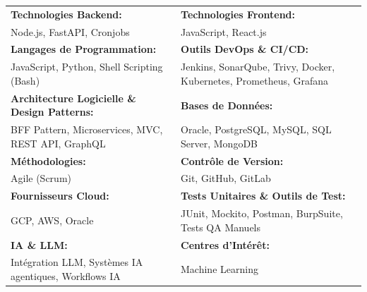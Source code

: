 \renewcommand{\arraystretch}{1.2}

\begin{tabular}{p{} p{}}
    \textbf{Technologies Backend:} & \textbf{Technologies Frontend:} \\
    Node.js, FastAPI, Cronjobs & JavaScript, React.js \\

    \textbf{Langages de Programmation:} & \textbf{Outils DevOps \& CI/CD:} \\
    JavaScript, Python, Shell Scripting (Bash) & Jenkins, SonarQube, Trivy, Docker, Kubernetes, Prometheus, Grafana \\

    \textbf{Architecture Logicielle \& Design Patterns:} & \textbf{Bases de Données:} \\
    BFF Pattern, Microservices, MVC, REST API, GraphQL & Oracle, PostgreSQL, MySQL, SQL Server, MongoDB \\

    \textbf{Méthodologies:} & \textbf{Contrôle de Version:} \\
    Agile (Scrum) & Git, GitHub, GitLab \\

    \textbf{Fournisseurs Cloud:} & \textbf{Tests Unitaires \& Outils de Test:} \\
    GCP, AWS, Oracle & JUnit, Mockito, Postman, BurpSuite, Tests QA Manuels \\

    \textbf{IA \& LLM:} & \textbf{Centres d'Intérêt:} \\
    Intégration LLM, Systèmes IA agentiques, Workflows IA & Machine Learning \\

\end{tabular}
